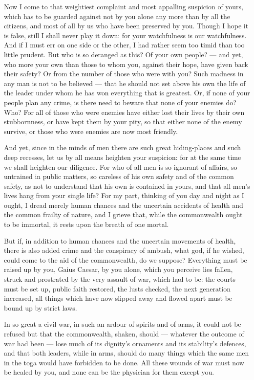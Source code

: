  Now I come to that weightiest complaint and most appalling suspicion of yours, which has to be guarded against not by you alone any more than by all the citizens, and most of all by us who have been preserved by you. Though I hope it is false, still I shall never play it down: for your watchfulness is our watchfulness. And if I must err on one side or the other, I had rather seem too timid than too little prudent. But who is so deranged as this? Of your own people? --- and yet, who more your own than those to whom you, against their hope, have given back their safety? Or from the number of those who were with you? Such madness in any man is not to be believed --- that he should not set above his own the life of the leader under whom he has won everything that is greatest. Or, if none of your people plan any crime, is there need to beware that none of your enemies do? Who? For all of those who were enemies have either lost their lives by their own stubbornness, or have kept them by your pity, so that either none of the enemy survive, or those who were enemies are now most friendly.

 And yet, since in the minds of men there are such great hiding-places and such deep recesses, let us by all means heighten your suspicion: for at the same time we shall heighten our diligence. For who of all men is so ignorant of affairs, so untrained in public matters, so careless of his own safety and of the common safety, as not to understand that his own is contained in yours, and that all men's lives hang from your single life? For my part, thinking of you day and night as I ought, I dread merely human chances and the uncertain accidents of health and the common frailty of nature, and I grieve that, while the commonwealth ought to be immortal, it rests upon the breath of one mortal.

 But if, in addition to human chances and the uncertain movements of health, there is also added crime and the conspiracy of ambush, what god, if he wished, could come to the aid of the commonwealth, do we suppose? Everything must be raised up by you, Gaius Caesar, by you alone, which you perceive lies fallen, struck and prostrated by the very assault of war, which had to be: the courts must be set up, public faith restored, the lusts checked, the next generation increased, all things which have now slipped away and flowed apart must be bound up by strict laws.

 In so great a civil war, in such an ardour of spirits and of arms, it could not be refused but that the commonwealth, shaken, should --- whatever the outcome of war had been --- lose much of its dignity's ornaments and its stability's defences, and that both leaders, while in arms, should do many things which the same men in the toga would have forbidden to be done. All these wounds of war must now be healed by you, and none can be the physician for them except you.

